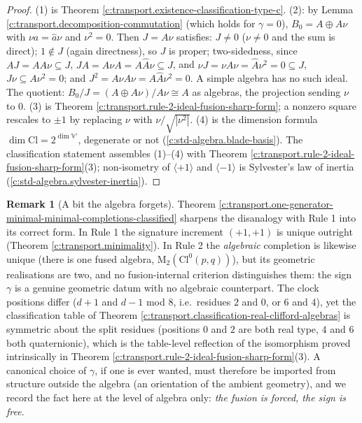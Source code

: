 \documentclass[11pt]{article}
\theoremstyle{definition}
\newtheorem{remark}[theorem]{Remark}
\theoremstyle{plain}
\providecommand{\Cl}{}\renewcommand{\Cl}{\mathrm{Cl}}
\providecommand{\Mat}{}\renewcommand{\Mat}{\mathrm{M}}
\begin{document}
\begin{proof}
(1) is Theorem \ref{c:transport.existence-classification-type-c}. (2): by Lemma \ref{c:transport.decomposition-commutation} (which holds for $\gamma = 0$), $B_0 = A \oplus A\nu$ with $\nu a = \hat{a}\nu$ and $\nu^2 = 0$. Then $J = A\nu$ satisfies: $J \neq 0$ ($\nu \neq 0$ and the sum is direct); $1 \notin J$ (again directness), so $J$ is proper; two-sidedness, since $A J = A A \nu \subseteq J$, $J A = A \nu A = A \hat{A} \nu \subseteq J$, and $\nu J = \nu A \nu = \hat{A} \nu^2 = 0 \subseteq J$, $J\nu \subseteq A\nu^2 = 0$; and $J^2 = A\nu A \nu = A \hat{A} \nu^2 = 0$. A simple algebra has no such ideal. The quotient: $B_0 / J = (A \oplus A\nu)/A\nu \cong A$ as algebras, the projection sending $\nu$ to $0$. (3) is Theorem \ref{c:transport.rule-2-ideal-fusion-sharp-form}; a nonzero square rescales to $\pm 1$ by replacing $\nu$ with $\nu/\sqrt{|\nu^2|}$. (4) is the dimension formula $\dim \Cl = 2^{\dim \mathbb{V}'}$, degenerate or not (\ref{c:std-algebra.blade-basis}). The classification statement assembles (1)--(4) with Theorem \ref{c:transport.rule-2-ideal-fusion-sharp-form}(3); non-isometry of $\langle +1\rangle$ and $\langle -1 \rangle$ is Sylvester's law of inertia (\ref{c:std-algebra.sylvester-inertia}).

\end{proof}

\begin{remark}[A bit the algebra forgets]\label{c:note.transport.bit-algebra-forgets}
Theorem \ref{c:transport.one-generator-minimal-minimal-completions-classified} sharpens the disanalogy with Rule 1 into its correct form. In Rule 1 the signature increment $(+1,+1)$ is unique outright (Theorem \ref{c:transport.minimality}). In Rule 2 the \emph{algebraic} completion is likewise unique (there is one fused algebra, $\Mat_2(\Cl^0(p,q))$), but its geometric realisations are two, and no fusion-internal criterion distinguishes them: the sign $\gamma$ is a genuine geometric datum with no algebraic counterpart. The clock positions differ ($d + 1$ and $d - 1$ mod 8, i.e.\ residues $2$ and $0$, or $6$ and $4$), yet the classification table of Theorem \ref{c:transport.classification-real-clifford-algebras} is symmetric about the split residues (positions $0$ and $2$ are both real type, $4$ and $6$ both quaternionic), which is the table-level reflection of the isomorphism proved intrinsically in Theorem \ref{c:transport.rule-2-ideal-fusion-sharp-form}(3). A canonical choice of $\gamma$, if one is ever wanted, must therefore be imported from structure outside the algebra (an orientation of the ambient geometry), and we record the fact here at the level of algebra only: \emph{the fusion is forced, the sign is free}.
\end{remark}
\end{document}
